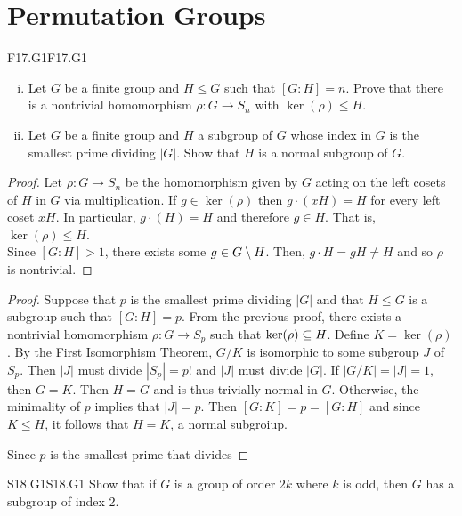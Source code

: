\documentclass[../AlgebraQualSolutions.tex]{subfiles}
\begin{document}
\section{Permutation Groups}

\begin{prob}{F17.G1}{F17.G1}
    \begin{enumerate}[(i)]
        \item Let $G$ be a finite group and $H \leq G$ such that $[G:H] = n$. Prove that there is a nontrivial homomorphism $\rho: G \to S_n$ with $\ker(\rho)\leq H$.
        \item Let $G$ be a finite group and $H$ a subgroup of $G$ whose index in $G$ is the smallest prime dividing $|G|$. Show that $H$ is a normal subgroup of $G$.
    \end{enumerate}
\end{prob}

\begin{proof}
    Let $\rho: G \to S_n$ be the homomorphism given by $G$ acting on the left cosets of $H$ in $G$ via multiplication. If $g \in \ker(\rho)$ then $g\cdot(xH) = H$ for every left coset $xH$. In particular, $g\cdot(H) = H$ and therefore $g \in H$. That is, $\ker(\rho) \leq H$.\\

    Since $[G:H] > 1$, there exists some $g \in G\setminus H$. Then, $g\cdot H = gH \neq H$ and so $\rho$ is nontrivial.
\end{proof}

\begin{proof}
    Suppose that $p$ is the smallest prime dividing $|G|$ and that $H \leq G$ is a subgroup such that $[G:H] = p$. From the previous proof, there exists a nontrivial homomorphism $\rho: G \to S_p$ such that $\ker(\rho) \subseteq H$. Define $K = \ker(\rho)$. By the First Isomorphism Theorem, $G/K$ is isomorphic to some subgroup $J$ of $S_p$. Then $|J|$ must divide $|S_p| = p!$ and $|J|$ must divide $|G|$. If $|G/K| = |J| = 1$, then $G = K$. Then $H = G$ and is thus trivially normal in $G$. Otherwise, the minimality of $p$ implies that $|J| = p$. Then $[G:K] = p = [G:H]$ and since $K \leq H$, it follows  that $H = K$, a normal subgroiup.
    
    Since $p$ is the smallest prime that divides 
\end{proof}


\begin{prob}{S18.G1}{S18.G1}
    Show that if $G$ is a group of order $2k$ where $k$ is odd, then $G$ has a subgroup of index 2.
\end{prob}
\end{document}
